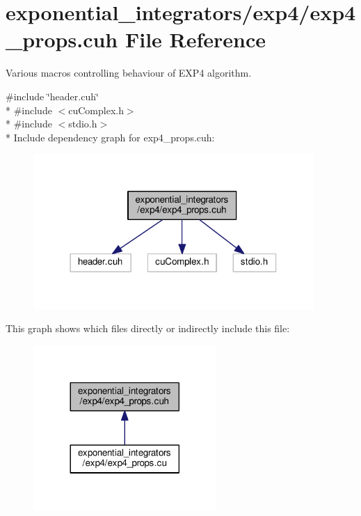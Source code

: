 \hypertarget{exp4__props_8cuh}{}\section{exponential\+\_\+integrators/exp4/exp4\+\_\+props.cuh File Reference}
\label{exp4__props_8cuh}


Various macros controlling behaviour of E\+X\+P4 algorithm.  


{\ttfamily \#include \char`\"{}header.\+cuh\char`\"{}}\\*
{\ttfamily \#include $<$cu\+Complex.\+h$>$}\\*
{\ttfamily \#include $<$stdio.\+h$>$}\\*
Include dependency graph for exp4\+\_\+props.\+cuh\+:\nopagebreak
\begin{figure}[H]
\begin{center}
\leavevmode
\includegraphics[width=302pt]{exp4__props_8cuh__incl}
\end{center}
\end{figure}
This graph shows which files directly or indirectly include this file\+:\nopagebreak
\begin{figure}[H]
\begin{center}
\leavevmode
\includegraphics[width=197pt]{exp4__props_8cuh__dep__incl}
\end{center}
\end{figure}
